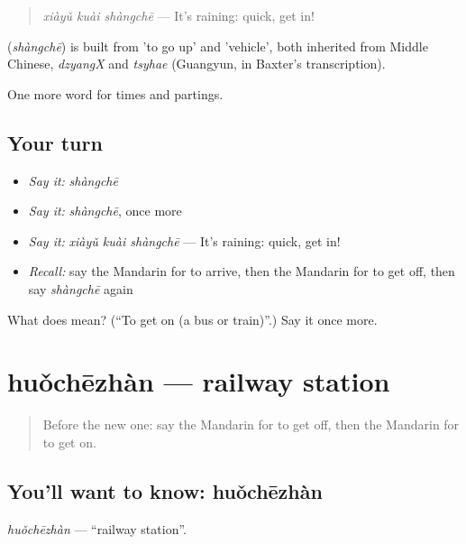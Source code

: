 \begin{quote}
\textbf{} \emph{xiàyǔ kuài shàngchē} — It's raining: quick, get in!
\end{quote}

\begin{cousinweb}
\textbf{} (\emph{shàngchē}) is built from  'to go up' and  'vehicle', both inherited from Middle Chinese, \emph{dzyangX} and \emph{tsyhae} (Guangyun, in Baxter's transcription).
\end{cousinweb}

\begin{grammarlens}[title={What you've built}]
One more word for times and partings.
\end{grammarlens}

\subsection*{Your turn}
\begin{itemize}
\raggedright
  \item \emph{Say it:} \emph{shàngchē}
  \item \emph{Say it:} \emph{shàngchē}, once more
  \item \emph{Say it:} \emph{xiàyǔ kuài shàngchē} — It's raining: quick, get in!
  \item \emph{Recall:} say the Mandarin for to arrive, then the Mandarin for to get off, then say \emph{shàngchē} again
\end{itemize}

\begin{tcolorbox}[breakable,colback=teal!4,colframe=teal!35!black,title={Before you move on}]
What does  mean? (\textquotedblleft{}To get on (a bus or train)\textquotedblright{}.) Say it once more.
\end{tcolorbox}
\section[huǒchēzhàn]{huǒchēzhàn — railway station}

\label{lesson:ZH-C73-huochezhan}



\begin{quote}
Before the new one: say the Mandarin for to get off, then the Mandarin for to get on.
\end{quote}

\subsection*{You'll want to know: huǒchēzhàn}
\emph{huǒchēzhàn} — \textquotedblleft{}railway station\textquotedblright{}.

